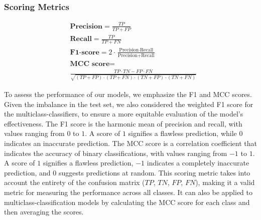\documentclass{bioinfo}
\begin{document}
\begin{methods}
\subsubsection{Scoring Metrics}

\begin{align*}
	&\textbf{Precision} = \frac{TP}{TP + FP} \\
    &\textbf{Recall} = \frac{TP}{TP + FN} \\
    &\textbf{F1-score} = 2 \cdot \frac{\text{Precision} \cdot \text{Recall}}{\text{Precision} + \text{Recall}} \\
	&\textbf{MCC score} =\\ 
	&\frac{TP \cdot TN - FP \cdot FN}{\sqrt{(TP + FP) \cdot (TP + FN) \cdot (TN + FP) \cdot (TN + FN)}}
\end{align*}

To assess the performance of our models, we emphasize the F1 and MCC scores. 
Given the imbalance in the test set, we also considered the weighted F1 score for the multiclass-classifiers,
to ensure a more equitable evaluation of the model's effectiveness.
The F1 score is the harmonic mean of precision and recall, with values ranging from $0$ to $1$.
A score of $1$ signifies a flawless prediction, while $0$ indicates an inaccurate prediction.
The MCC score is a correlation coefficient that indicates the accuracy of binary classifications, with values ranging from $-1$ to $1$. 
A score of $1$ signifies a flawless prediction, $-1$ indicates a completely inaccurate prediction, and $0$ suggests predictions at random.
This scoring metric takes into account the entirety of the confusion matrix ($TP$, $TN$, $FP$, $FN$), making it a valid
metric for measuring the performance across all classes.
It can also be applied to multiclass-classification models by calculating the MCC score for each class and then averaging the scores.


\end{methods}
\end{document}
